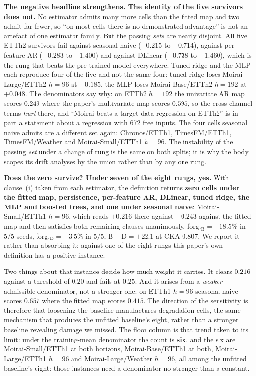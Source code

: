 \textbf{The negative headline strengthens.  The identity of the five survivors
does not.}  No estimator admits many more cells than the fitted map and two admit
far fewer, so ``on most cells there is no demonstrated advantage'' is not an
artefact of one estimator family.  But the passing \emph{sets} are nearly
disjoint.  All five ETTh2 survivors fail against seasonal naive ($-0.215$ to
$-0.714$), against per-feature AR ($-0.283$ to $-1.400$) and against DLinear
($-0.738$ to $-1.460$), which is the rung that beats the pre-trained model
everywhere.  Tuned ridge and the MLP each reproduce four of the five and not the
same four: tuned ridge loses Moirai-Large/ETTh2 $h{=}96$ at $+0.185$, the MLP
loses Moirai-Base/ETTh2 $h{=}192$ at $+0.048$.  The
denominators say why: on ETTh2 $h{=}192$ the univariate AR map scores $0.249$
where the paper's multivariate map scores $0.595$, so the cross-channel terms
\emph{hurt} there, and ``Moirai beats a target-data regression on ETTh2'' is in
part a statement about a regression with 672 free inputs.  The four cells
seasonal naive admits are a different set again: Chronos/ETTh1, TimesFM/ETTh1,
TimesFM/Weather and Moirai-Small/ETTh1 $h{=}96$.  The instability of the passing
\emph{set} under a change of rung is the same on both splits; it is why the body
scopes its drift analyses by the union rather than by any one rung.

\textbf{Does the zero survive?  Under seven of the eight rungs, yes.}  With
clause~(i) taken from each estimator, the definition returns \textbf{zero cells
under the fitted map, persistence, per-feature AR, DLinear, tuned ridge, the MLP
and boosted trees, and one under seasonal naive}: Moirai-Small/ETTh1 $h{=}96$, which reads $+0.216$ there
against $-0.243$ against the fitted map and then satisfies both remaining clauses
unanimously, forg.$_\text{B}{=}{+}18.5\%$ in 5/5 seeds,
forg.$_\text{D}{=}{-}3.5\%$ in 5/5, $\text{B}{-}\text{D}{=}{+}22.1$ at CKA
$0.807$.  We report it rather than absorbing it: against one of the eight rungs
this paper's own definition has a positive instance.

Two things about that instance decide how much weight it carries.  It clears
$0.216$ against a threshold of $0.20$ and fails at $0.25$.  And it arises from a
\emph{weaker} admissible denominator, not a stronger one: on ETTh1 $h{=}96$
seasonal naive scores $0.657$ where the fitted map scores $0.415$.  The direction
of the sensitivity is therefore that loosening the baseline manufactures
degradation cells, the same mechanism that produces the unfitted baseline's
eight, rather than a stronger baseline revealing damage we missed.  The floor column is that trend
taken to its limit: under the training-mean denominator the count is
\textbf{six}, and the six are Moirai-Small/ETTh1 at both horizons,
Moirai-Base/ETTh1 at both, Moirai-Large/ETTh1 $h{=}96$ and Moirai-Large/Weather
$h{=}96$, all among the unfitted baseline's eight: those instances need a
denominator no stronger than a constant.

